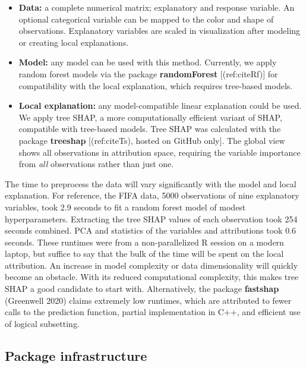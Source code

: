 \documentclass[
]{article}
\begin{document}
\begin{itemize}
    \item \textbf{Data:} a complete numerical matrix; explanatory and response variable. An optional categorical variable can be mapped to the color and shape of observations. Explanatory variables are scaled in visualization after modeling or creating local explanations. 
    \item \textbf{Model:} any model can be used with this method. Currently, we apply random forest models via the package \textbf{randomForest} [(ref:citeRf)] for compatibility with the local explanation, which requires tree-based models.
    \item \textbf{Local explanation:} any model-compatible linear explanation could be used. We apply tree SHAP, a more computationally efficient variant of SHAP, compatible with tree-based models. Tree SHAP was calculated with the package \textbf{treeshap} [(ref:citeTs), hosted on GitHub only]. The global view shows all observations in attribution space, requiring the variable importance from \emph{all} observations rather than just one.
\end{itemize}

The time to preprocess the data will vary significantly with the model
and local explanation. For reference, the FIFA data, 5000 observations
of nine explanatory variables, took 2.9 seconds to fit a random forest
model of modest hyperparameters. Extracting the tree SHAP values of each
observation took 254 seconds combined. PCA and statistics of the
variables and attributions took 0.6 seconds. These runtimes were from a
non-parallelized R session on a modern laptop, but suffice to say that
the bulk of the time will be spent on the local attribution. An increase
in model complexity or data dimensionality will quickly become an
obstacle. With its reduced computational complexity, this makes tree
SHAP a good candidate to start with. Alternatively, the package
\textbf{fastshap} (Greenwell 2020) claims extremely low runtimes, which
are attributed to fewer calls to the prediction function, partial
implementation in C++, and efficient use of logical subsetting.

\hypertarget{sec:infrastructure}{%
\subsection{Package infrastructure}\label{sec:infrastructure}}
\end{document}
